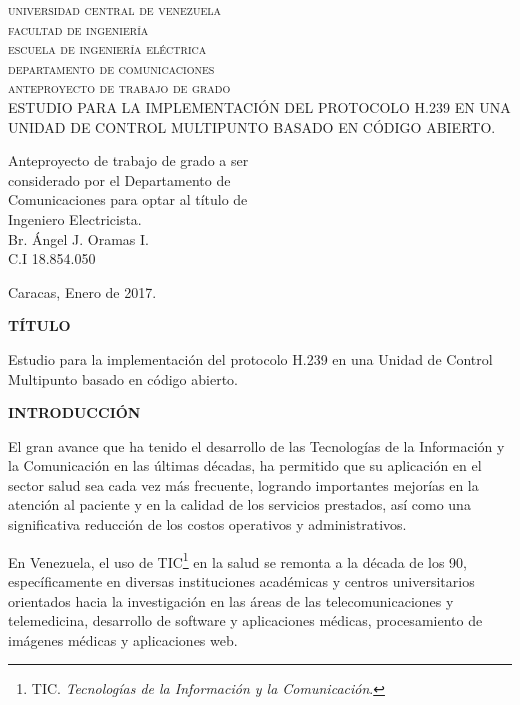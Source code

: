\documentclass[12pt,letterpaper]{article}
\begin{document}
		

\begin{titlepage}	
\begin{center}
\textsc{universidad central de venezuela\\facultad de ingeniería\\escuela de ingeniería eléctrica\\departamento de comunicaciones\\anteproyecto de trabajo de grado\\}
\vspace*{5cm}
ESTUDIO PARA LA IMPLEMENTACIÓN DEL PROTOCOLO H.239 EN UNA UNIDAD DE CONTROL MULTIPUNTO BASADO EN CÓDIGO ABIERTO.
\end{center}
\vspace*{4cm}

\begin{flushright}
{\footnotesize Anteproyecto de trabajo de grado a ser\\considerado por el Departamento de\\Comunicaciones para optar al título de\\Ingeniero Electricista.}\\
\vspace*{1cm}Br. Ángel J. Oramas I.\\C.I 18.854.050
\end{flushright}

\vfill \centerline {Caracas, Enero de 2017.}	
\end{titlepage}

\newpage
\centerline{\textbf{TÍTULO}}

Estudio para la implementación del protocolo H.239 en una Unidad de Control Multipunto basado en código abierto.

\centerline{\textbf{INTRODUCCIÓN}}

El gran avance que ha tenido el desarrollo de las Tecnologías de la Información y la Comunicación en las últimas décadas, ha permitido que su aplicación en el sector salud sea cada vez más frecuente, logrando importantes mejorías en la atención al paciente y en la calidad de los servicios prestados, así como una significativa reducción de los costos  operativos y administrativos.

En Venezuela, el uso de TIC\footnote{TIC. \emph{Tecnologías de la Información y la Comunicación}.} en la salud se remonta a la década de los 90, específicamente en diversas instituciones académicas y centros universitarios orientados hacia la investigación en las áreas de las telecomunicaciones y telemedicina, desarrollo de software y aplicaciones médicas, procesamiento de imágenes médicas y aplicaciones web.
\end{document}
